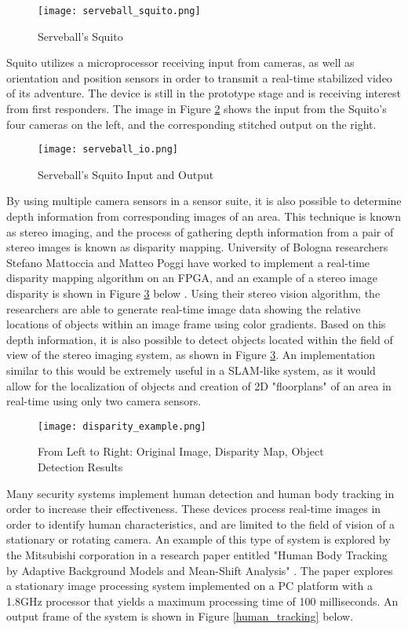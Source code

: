\begin{figure}[H]
	\centerline{\texttt{[image: serveball\_squito.png]}}
	\caption{Serveball's Squito \cite{serveball}}
	\label{squito}
\end{figure}

Squito utilizes a microprocessor receiving input from cameras, as well as orientation and position sensors in order to transmit a real-time stabilized video of its adventure. The device is still in the prototype stage and is receiving interest from first responders. The image in Figure \ref{squito_io} shows the input from the Squito's four cameras on the left, and the corresponding stitched output on the right.

\begin{figure}[H]
	\centerline{\texttt{[image: serveball\_io.png]}}
	\caption{Serveball's Squito Input and Output \cite{serveball}}
	\label{squito_io}
\end{figure}

By using multiple camera sensors in a sensor suite, it is also possible to determine depth information from corresponding images of an area. This technique is known as stereo imaging, and the process of gathering depth information from a pair of stereo images is known as disparity mapping. University of Bologna researchers Stefano Mattoccia and Matteo Poggi have worked to implement a real-time disparity mapping algorithm on an FPGA, and an example of a stereo image disparity is shown in Figure \ref{disparity_example} below \cite{mattoccia}. Using their stereo vision algorithm, the researchers are able to generate real-time image data showing the relative locations of objects within an image frame using color gradients. Based on this depth information, it is also possible to detect objects located within the field of view of the stereo imaging system, as shown in Figure \ref{disparity_example}. An implementation similar to this would be extremely useful in a SLAM-like system, as it would allow for the localization of objects and creation of 2D "floorplans" of an area in real-time using only two camera sensors.

\begin{figure}[H]
	\centerline{\texttt{[image: disparity\_example.png]}}
	\caption{From Left to Right: Original Image, Disparity Map, Object Detection Results \cite{mattoccia}}
	\label{disparity_example}
\end{figure}

Many security systems implement human detection and human body tracking in order to increase their effectiveness. These devices process real-time images in order to identify human characteristics, and are limited to the field of vision of a stationary or rotating camera. An example of this type of system is explored by the Mitsubishi corporation in a research paper entitled "Human Body Tracking by Adaptive Background Models and Mean-Shift Analysis" \cite{porikli}. The paper explores a stationary image processing system implemented on a PC platform with a 1.8GHz processor that yields a maximum processing time of 100 milliseconds. An output frame of the system is shown in Figure \ref{human_tracking} below.

